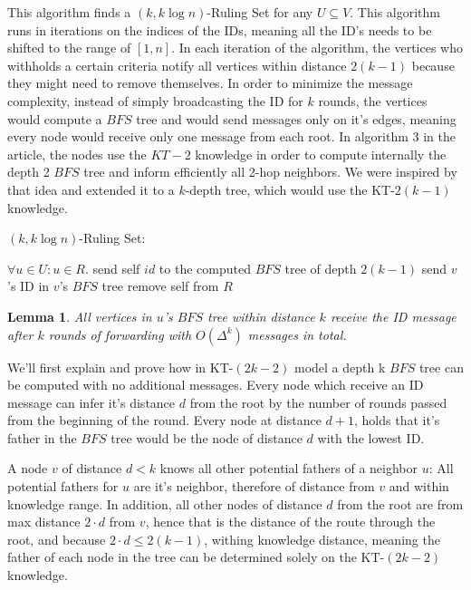 \documentclass[11pt]{article}
\newtheorem{lemma}{Lemma}
\begin{document}
This algorithm finds a $(k, k\log{n})$-Ruling Set for any $U\subseteq V$. This algorithm runs in iterations on the indices of the IDs, meaning all the ID's needs to be shifted to the range of $[1,n]$. In each iteration of the algorithm, the vertices who withholds a certain criteria notify all vertices within distance $2(k-1)$ because they might need to remove themselves. In order to minimize the message complexity, instead of simply broadcasting the ID for $k$ rounds, the vertices would compute a $BFS$ tree and would send messages only on it's edges, meaning every node would receive only one message from each root. In algorithm 3 in the article, the nodes use the $KT-2$ knowledge in order to compute internally the depth 2 $BFS$ tree and inform efficiently all 2-hop neighbors. We were inspired by that idea and extended it to a $k$-depth tree, which would use the KT-$2(k-1)$ knowledge.

\begin{algorithm}
\caption{$(k, k\log{n})$-Ruling Set:}
\begin{algorithmic}[1]
\State $\forall u\in U: u\in R$.
        \State send self $id$ to the computed $BFS$ tree of depth $2(k-1)$
    \EndIf
        \State send $v$'s ID in $v$'s $BFS$ tree
            \State remove self from $R$
        \EndIf
    \EndIf
\EndFor
\end{algorithmic}
\end{algorithm}


\begin{lemma}
\label{bfs_tree}
All vertices in $u$'s $BFS$ tree within distance $k$ receive the ID message after $k$ rounds of forwarding with $O(\Delta^k)$ messages in total. 
\end{lemma}
We'll first explain and prove how in KT-$(2k-2)$ model a depth k $BFS$ tree can be computed with no additional messages.
Every node which receive an ID message can infer it's distance $d$ from the root by the number of rounds passed from the beginning of the round. Every node at distance $d+1$, holds that it's father in the $BFS$ tree would be the node of distance $d$ with the lowest ID.


A node $v$ of distance $d<k$ knows all other potential fathers of a neighbor $u$: 
All potential fathers for $u$ are it's neighbor, therefore of distance from $v$ and within knowledge range. In addition, all other nodes of distance $d$ from the root are from max distance $2\cdot d$ from $v$, hence that is the distance of the route through the root, and because $2\cdot d\le 2(k-1)$, withing knowledge distance, meaning the father of each node in the tree can be determined solely on the KT-$(2k-2)$ knowledge.
\end{document}
